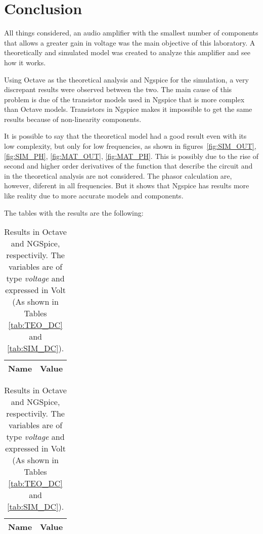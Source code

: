 \section{Conclusion}
\label{sec:conclusion}

All things considered, an audio amplifier with the smallest number of components that allows a greater gain in voltage was the main objective of this laboratory. A theoretically and simulated model was created to analyze this amplifier and see how it works. \par
Using Octave as the theoretical analysis and Ngspice for the simulation, a very discrepant results were observed between the two. The main cause of this problem is due of the transistor models used in Ngspice that is more complex than Octave models. Transistors in Ngspice makes it impossible to get the same results because of non-linearity components.\par
It is possible to say that the theoretical model had a good result even with its low complexity, but only for low frequencies, as shown in figures~\ref{fig:SIM_OUT}, \ref{fig:SIM_PH}, \ref{fig:MAT_OUT}, \ref{fig:MAT_PH}. This is possibly due to the rise of second and higher order derivatives of the function that describe the circuit and in the theoretical analysis are not considered. The phasor calculation are, however, diferent in all frequencies. But it shows that Ngspice has results more like reality due to more accurate models and components.

The tables with the results are the following:


\begin{table}[h]
\centering
\begin{minipage}[t]{0.35\linewidth}
 	 \begin{tabular}[t]{|l|r|}
 	   \hline    
 	   {\bf Name} & {\bf Value} \\ \hline
 	   
 	 \end{tabular}
\end{minipage}
\begin{minipage}[t]{0.40\linewidth}
  	\begin{tabular}[t]{|l|r|}
    	\hline    
   		{\bf Name} & {\bf Value} \\ \hline
    	
  	\end{tabular}
\end{minipage}

  	\caption{Results in Octave and NGSpice, respectivily. The variables are of type {\it voltage} and expressed in Volt (As shown in Tables \ref{tab:TEO_DC} and \ref{tab:SIM_DC}).}
\end{table}

